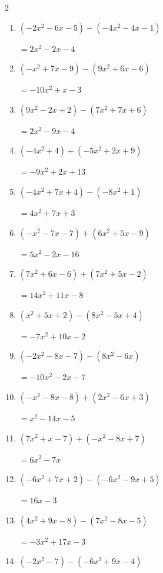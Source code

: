 \begin{multicols}{2}
\begin{enumerate}
  \item $(-2x^{2}-6x-5)-(-4x^{2}-4x-1)$

        $=2x^{2}-2x-4$

  \item $(-x^{2}+7x-9)-(9x^{2}+6x-6)$

        $=-10x^{2}+x-3$

  \item $(9x^{2}-2x+2)-(7x^{2}+7x+6)$

        $=2x^{2}-9x-4$

  \item $(-4x^{2}+4)+(-5x^{2}+2x+9)$

        $=-9x^{2}+2x+13$

  \item $(-4x^{2}+7x+4)-(-8x^{2}+1)$

        $=4x^{2}+7x+3$

  \item $(-x^{2}-7x-7)+(6x^{2}+5x-9)$

        $=5x^{2}-2x-16$

\columnbreak %

\resetques

  \item $(7x^{2}+6x-6)+(7x^{2}+5x-2)$

        $=14x^{2}+11x-8$

  \item $(x^{2}+5x+2)-(8x^{2}-5x+4)$

        $=-7x^{2}+10x-2$

  \item $(-2x^{2}-8x-7)-(8x^{2}-6x)$

        $=-10x^{2}-2x-7$

  \item $(-x^{2}-8x-8)+(2x^{2}-6x+3)$

        $=x^{2}-14x-5$

  \item $(7x^{2}+x-7)+(-x^{2}-8x+7)$

        $=6x^{2}-7x$

  \item $(-6x^{2}+7x+2)-(-6x^{2}-9x+5)$

        $=16x-3$

  \item $(4x^{2}+9x-8)-(7x^{2}-8x-5)$

        $=-3x^{2}+17x-3$

  \item $(-2x^{2}-7)-(-6x^{2}+9x-4)$


\end{enumerate}
\end{multicols}
